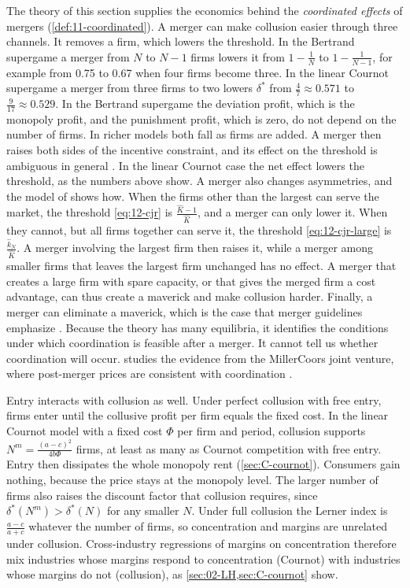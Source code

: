 The theory of this section supplies the economics behind the \emph{coordinated effects} of mergers
(\cref{def:11-coordinated}). A merger can make collusion easier through three channels. It removes a firm, which
lowers the threshold. In the Bertrand supergame a merger from $N$ to $N - 1$ firms lowers it from $1 - \frac{1}{N}$
to $1 - \frac{1}{N - 1}$, for example from 0.75 to 0.67 when four firms become three. In the linear Cournot
supergame a merger from three firms to two lowers $\delta^*$ from $\frac{4}{7} \approx 0.571$ to
$\frac{9}{17} \approx 0.529$. In the Bertrand supergame the deviation profit, which is the monopoly profit, and the
punishment profit, which is zero, do not depend on the number of firms. In richer models both fall as firms are
added. A merger then raises both sides of the incentive constraint, and its effect on the threshold is ambiguous in
general \citep[p.~239]{AskerNocke2021}. In the linear Cournot case the net effect lowers the threshold, as the
numbers above show. A merger also changes
asymmetries, and the model of \citet{CompteJennyRey2002} shows how. When the firms other than the largest can serve
the market, the threshold \eqref{eq:12-cjr} is $\frac{\hat K - 1}{\hat K}$, and a merger can only lower it. When
they cannot, but all firms together can serve it, the threshold \eqref{eq:12-cjr-large} is $\frac{\hat k_N}{\hat K}$.
A merger involving the largest firm
then raises it, while a merger among smaller firms that leaves the largest firm unchanged has no effect. A merger that
creates a large firm with spare capacity, or that gives the merged firm a cost advantage, can thus create a maverick
and make collusion harder. Finally, a merger can eliminate a maverick, which is the case that merger guidelines
emphasize \citep{USDOJFTC2010}. Because the theory has many equilibria, it identifies the conditions under which
coordination is feasible after a merger. It cannot tell us whether coordination will occur. 
studies the evidence from the MillerCoors joint venture, where post-merger prices are consistent with coordination
\citep{MillerWeinberg2017}.

Entry interacts with collusion as well. Under perfect collusion with free entry, firms enter until the collusive
profit per firm equals the fixed cost. In the linear Cournot model with a fixed cost $\Phi$ per firm and period,
collusion supports $N^m = \frac{(a - c)^2}{4b\Phi}$ firms, at least as many as Cournot competition with free entry.
Entry then dissipates the whole monopoly rent (\cref{sec:C-cournot}). Consumers gain nothing, because the price stays at the monopoly level. The larger number
of firms also raises the discount factor that collusion requires, since $\delta^*(N^m) > \delta^*(N)$ for any smaller
$N$. Under full collusion the Lerner index is $\frac{a - c}{a + c}$ whatever the number of firms,
so concentration and margins are unrelated under collusion. Cross-industry regressions of margins on concentration
therefore mix industries whose margins respond to concentration (Cournot) with industries whose margins do not
(collusion), as \cref{sec:02-LH,sec:C-cournot} show.
